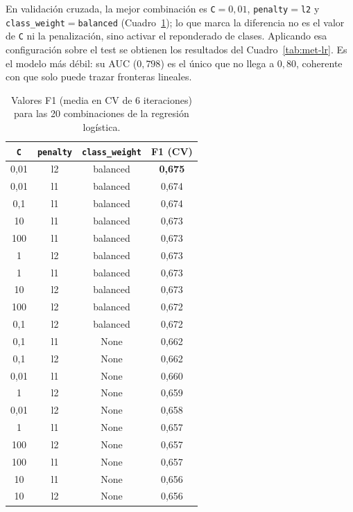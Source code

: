 \documentclass[12pt,a4paper]{report}
\theoremstyle{definition}
\newcommand{\tc}[1]{\texttt{#1}}
\begin{document}
En validación cruzada, la mejor combinación es \tc{C}${}=0{,}01$,
\tc{penalty}${}=$\tc{l2} y \tc{class\_weight}${}=$\tc{balanced} (Cuadro~\ref{tab:grid-lr}); lo
que marca la diferencia no es el valor de \tc{C} ni la penalización, sino activar el
reponderado de clases. Aplicando esa configuración sobre el test se obtienen los resultados del
Cuadro~\ref{tab:met-lr}. Es el modelo más débil: su AUC ($0{,}798$) es el
único que no llega a $0{,}80$, coherente con que solo puede trazar fronteras lineales.


\begin{table}[H]
\centering\footnotesize
\begin{tabular}{cccc}
\toprule
\tc{C} & \tc{penalty} & \tc{class\_weight} & F1 (CV) \\
\midrule
0,01 & l2 & balanced & \textbf{0,675} \\
0,01 & l1 & balanced & 0,674 \\
0,1 & l1 & balanced & 0,674 \\
10 & l1 & balanced & 0,673 \\
100 & l1 & balanced & 0,673 \\
1 & l2 & balanced & 0,673 \\
1 & l1 & balanced & 0,673 \\
10 & l2 & balanced & 0,673 \\
100 & l2 & balanced & 0,672 \\
0,1 & l2 & balanced & 0,672 \\
0,1 & l1 & None & 0,662 \\
0,1 & l2 & None & 0,662 \\
0,01 & l1 & None & 0,660 \\
1 & l2 & None & 0,659 \\
0,01 & l2 & None & 0,658 \\
1 & l1 & None & 0,657 \\
100 & l2 & None & 0,657 \\
100 & l1 & None & 0,657 \\
10 & l1 & None & 0,656 \\
10 & l2 & None & 0,656 \\
\bottomrule
\end{tabular}
\caption{Valores F1 (media en CV de 6 iteraciones) para las 20 combinaciones de la regresión
logística.}
\label{tab:grid-lr}
\end{table}
\end{document}

